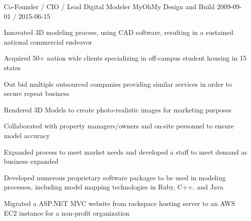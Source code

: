 \begin{cventries}
  \cventry
    {Co-Founder / CIO / Lead Digital Modeler}
    {MyOhMy Design and Build}
    {}
    {2009-09-01 / 2015-06-15}
    {
          \begin{cvitems}
                \item{Innovated 3D modeling process, using CAD software, resulting in a sustained national commercial endeavor}
                    \begin{cvitemssub}
                        \item{Acquired 50+ nation wide clients specializing in off-campus student housing in 15 states}
                        \item{Out bid multiple outsourced companies providing similar services in order to secure repeat business}
                    \end{cvitemssub}
                \item{Rendered 3D Models to create photo-realistic images for marketing purposes}
                \item{Collaborated with property managers/owners and on-site personnel to ensure model accuracy}
                \item{Expanded process to meet market needs and developed a staff to meet demand as business expanded}
                    \begin{cvitemssub}
                        \item{Developed numerous proprietary software packages to be used in modeling processes, including model mapping technologies in Ruby, C++, and Java}
                    \end{cvitemssub}
                \item{Migrated a ASP.NET MVC website from rackspace hosting server to an AWS EC2 instance for a non-profit organization}
          \end{cvitems}
    }
 

\end{cventries}
